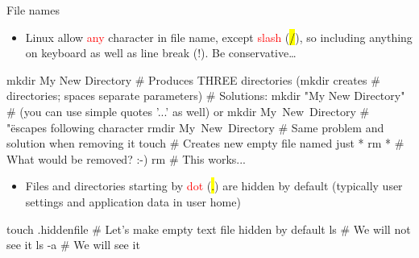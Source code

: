 \documentclass[compress, ucs, xelatex, 11pt, xcolor=svgnames,
  hyperref={
    bookmarks=true,
    unicode=true,
    colorlinks=true,
    pdftitle={Linux, command line and MetaCentrum},
    plainpages=false,
    pdfauthor={Vojtech Zeisek},
    pdfsubject={Course about use of Linux command line, writing shell scripts and using MetaCentrum of CESNET},
    pdfcreator={XeLaTeX},
    pdfkeywords={Linux, GNU, BASH, shell, command line, MetaCentrum},
    linkcolor=Red,
    anchorcolor=Blue,
    citecolor=Purple,
    filecolor=DodgerBlue,
    menucolor=DarkOrchid,
    urlcolor=DeepSkyBlue,
    pdftex},
  url={hyphens, lowtilde} %
  ]{beamer}
\renewcommand{\texttt}[1]{\hl{\ttfamily #1}}
\renewcommand{\alert}[1]{\textcolor{red}{#1}}
\begin{document}
\begin{frame}[fragile]{File names}
\begin{itemize}
  \item Linux allow \alert{any} character in file name, except \alert{slash} (\texttt{/}), so including anything on keyboard as well as line break (!). Be conservative\ldots
\end{itemize}
  \begin{bashcode}
    mkdir My New Directory # Produces THREE directories (mkdir creates
                           # directories; spaces separate parameters)
                           # Solutions:
    mkdir "My New Directory" # (you can use simple quotes '...' as well) or
    mkdir My\ New\ Directory # "\" escapes following character
    rmdir My\ New\ Directory # Same problem and solution when removing it
    touch \* # Creates new empty file named just *
    rm * # What would be removed? :-)
    rm \* # This works...
  \end{bashcode}
\begin{itemize}
  \item Files and directories starting by \alert{dot} (\texttt{.}) are hidden by default (typically user settings and application data in user home)
\end{itemize}
  \begin{bashcode}
    touch .hiddenfile # Let's make empty text file hidden by default
    ls # We will not see it
    ls -a # We will see it
  \end{bashcode}
\end{frame}
\end{document}
